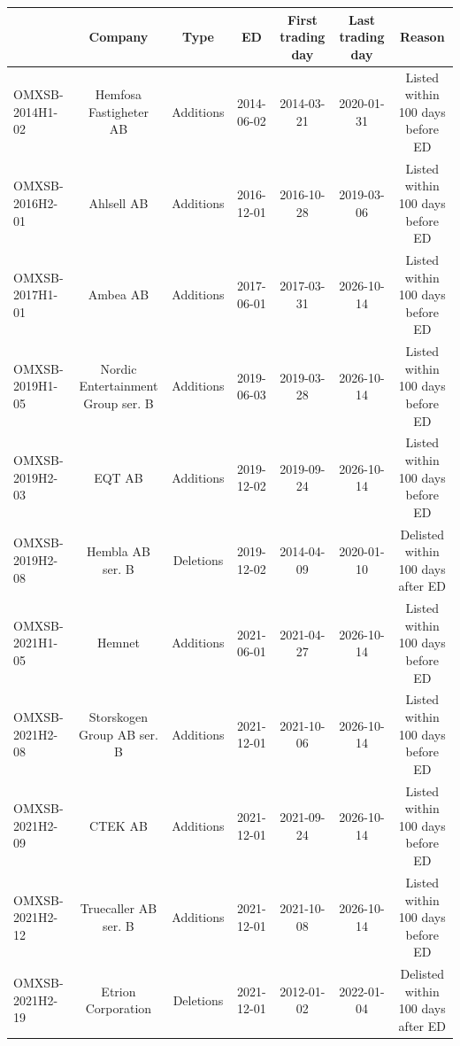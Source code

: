 \begin{threeparttable}
\begingroup
\renewcommand\cellalign{t}
\renewcommand\arraystretch{1}
\setlength{\tabcolsep}{5pt}
\begin{tabular}{@{}lcccccc}
\toprule
 & Company & Type & ED & First trading day & Last trading day & Reason \\
\midrule
\addlinespace[1ex]
OMXSB-2014H1-02 & Hemfosa Fastigheter AB & Additions & 2014-06-02 & 2014-03-21 & 2020-01-31 & Listed within 100 days before ED \\
\addlinespace[0.25ex]
\addlinespace[0.25ex]
OMXSB-2016H2-01 & Ahlsell AB & Additions & 2016-12-01 & 2016-10-28 & 2019-03-06 & Listed within 100 days before ED \\
\addlinespace[0.25ex]
\addlinespace[0.25ex]
OMXSB-2017H1-01 & Ambea AB & Additions & 2017-06-01 & 2017-03-31 & 2026-10-14 & Listed within 100 days before ED \\
\addlinespace[0.25ex]
\addlinespace[0.25ex]
OMXSB-2019H1-05 & Nordic Entertainment Group ser. B & Additions & 2019-06-03 & 2019-03-28 & 2026-10-14 & Listed within 100 days before ED \\
\addlinespace[0.25ex]
\addlinespace[0.25ex]
OMXSB-2019H2-03 & EQT AB & Additions & 2019-12-02 & 2019-09-24 & 2026-10-14 & Listed within 100 days before ED \\
\addlinespace[0.25ex]
\addlinespace[0.25ex]
OMXSB-2019H2-08 & Hembla AB ser. B & Deletions & 2019-12-02 & 2014-04-09 & 2020-01-10 & Delisted within 100 days after ED \\
\addlinespace[0.25ex]
\addlinespace[0.25ex]
OMXSB-2021H1-05 & Hemnet & Additions & 2021-06-01 & 2021-04-27 & 2026-10-14 & Listed within 100 days before ED \\
\addlinespace[0.25ex]
\addlinespace[0.25ex]
OMXSB-2021H2-08 & Storskogen Group AB ser. B & Additions & 2021-12-01 & 2021-10-06 & 2026-10-14 & Listed within 100 days before ED \\
\addlinespace[0.25ex]
\addlinespace[0.25ex]
OMXSB-2021H2-09 & CTEK AB & Additions & 2021-12-01 & 2021-09-24 & 2026-10-14 & Listed within 100 days before ED \\
\addlinespace[0.25ex]
\addlinespace[0.25ex]
OMXSB-2021H2-12 & Truecaller AB ser. B & Additions & 2021-12-01 & 2021-10-08 & 2026-10-14 & Listed within 100 days before ED \\
\addlinespace[0.25ex]
\addlinespace[0.25ex]
OMXSB-2021H2-19 & Etrion Corporation & Deletions & 2021-12-01 & 2012-01-02 & 2022-01-04 & Delisted within 100 days after ED \\

\end{tabular}
\end{threeparttable}
